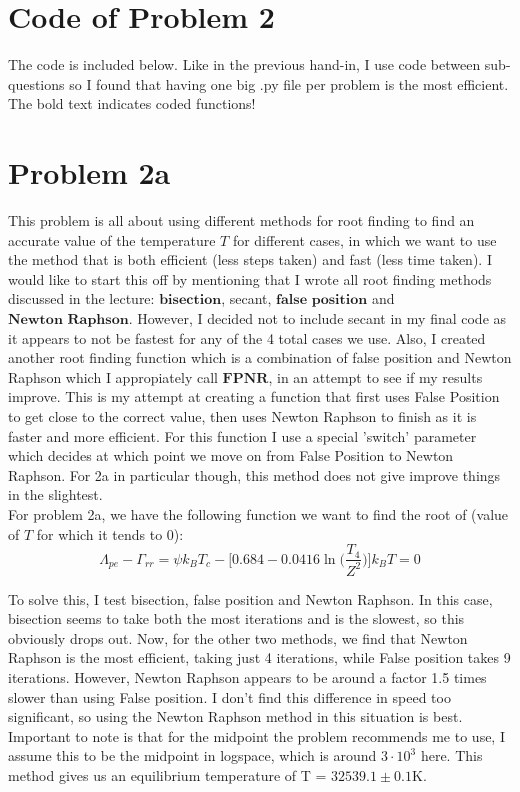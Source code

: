 \section*{Code of Problem 2}

The code is included below. Like in the previous hand-in, I use code between sub-questions so I found that having one big .py file per problem is the most efficient. The bold text indicates coded functions! 



\section*{Problem 2a}

This problem is all about using different methods for root finding to find an accurate value of the temperature $T$ for different cases, in which we want to use the method that is both efficient (less steps taken) and fast (less time taken). I would like to start this off by mentioning that I wrote all root finding methods discussed in the lecture: $\textbf{bisection}$, secant, $\textbf{false position}$ and $\textbf{Newton Raphson}$. However, I decided not to include secant in my final code as it appears to not be fastest for any of the 4 total cases we use. Also, I created another root finding function which is a combination of false position and Newton Raphson which I appropiately call $\textbf{FPNR}$, in an attempt to see if my results improve. This is my attempt at creating a function that first uses False Position to get close to the correct value, then uses Newton Raphson to finish as it is faster and more efficient. For this function I use a special 'switch' parameter which decides at which point we move on from False Position to Newton Raphson. For 2a in particular though, this method does not give improve things in the slightest.\\

For problem 2a, we have the following function we want to find the root of (value of $T$ for which it tends to 0):\\

\begin{equation}
	\Lambda_{pe} - \Gamma_{rr} = \psi k_B T_c - \Bigg[0.684 - 0.0416 \ln \Big(\frac{T_4}{Z^2}\Big) \Bigg] k_B T = 0
\end{equation}

To solve this, I test bisection, false position and Newton Raphson. In this case, bisection seems to take both the most iterations and is the slowest, so this obviously drops out. Now, for the other two methods, we find that Newton Raphson is the most efficient, taking just 4 iterations, while False position takes 9 iterations. However, Newton Raphson appears to be around a factor 1.5 times slower than using False position. I don't find this difference in speed too significant, so using the Newton Raphson method in this situation is best. Important to note is that for the midpoint the problem recommends me to use, I assume this to be the midpoint in logspace, which is around $3 \cdot 10^3$ here. This method gives us an equilibrium temperature of T = $32539.1 \pm 0.1$K.

